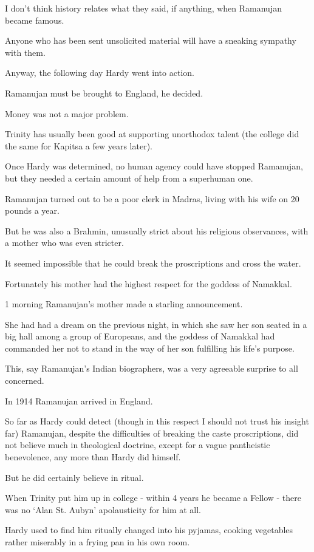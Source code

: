 \documentclass{article}
\numberwithin{equation}{section}
\begin{document}
I don't think history relates what they said, if anything, when Ramanujan became famous.

Anyone who has been sent unsolicited material will have a sneaking sympathy with them.

%
Anyway, the following day Hardy went into action.

Ramanujan must be brought to England, he decided.

Money was not a major problem.

Trinity has usually been good at supporting unorthodox talent (the college did the same for Kapitsa a few years later).

Once Hardy was determined, no human agency could have stopped Ramanujan, but they needed a certain amount of help from a superhuman one.

%
Ramanujan turned out to be a poor clerk in Madras, living with his wife on 20 pounds a year.

But he was also a Brahmin, unusually strict about his religious observances, with a mother who was even stricter.

It seemed impossible that he could break the proscriptions and cross the water.

Fortunately his mother had the highest respect for the goddess of Namakkal.

1 morning Ramanujan's mother made a starling announcement.

She had had a dream on the previous night, in which she saw her son seated in a big hall among a group of Europeans, and the goddess of Namakkal had commanded her not to stand in the way of her son fulfilling his life's purpose.

This, say Ramanujan's Indian biographers, was a very agreeable surprise to all concerned.

%
In 1914 Ramanujan arrived in England.

So far as Hardy could detect (though in this respect I should not trust his insight far) Ramanujan, despite the difficulties of breaking the caste proscriptions, did not believe much in theological doctrine, except for a vague pantheistic benevolence, any more than Hardy did himself.

But he did certainly believe in ritual.

When Trinity put him up in college - within 4 years he became a Fellow - there was no `Alan St. Aubyn' apolausticity for him at all.

Hardy used to find him ritually changed into his pyjamas, cooking vegetables rather miserably in a frying pan in his own room.
\end{document}
